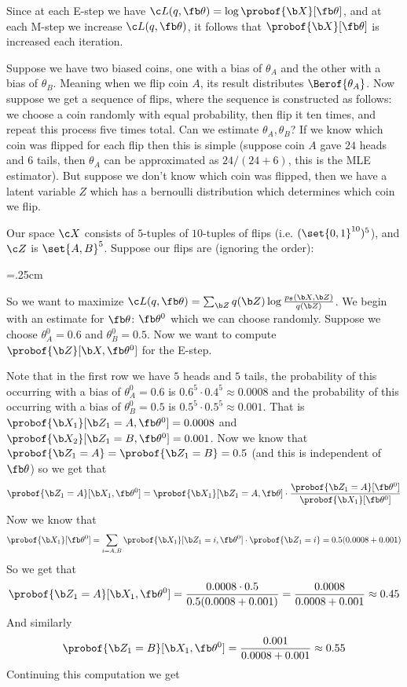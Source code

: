 Since at each E-step we have $\c L(q,\fb\theta)=\log\probof{\b X}[\fb\theta]$, and at each M-step we increase $\c L(q,\fb\theta)$, it follows that $\probof{\b X}[\fb\theta]$ is increased each iteration.

\bexam

    Suppose we have two biased coins, one with a bias of $\theta_A$ and the other with a bias of $\theta_B$.
    Meaning when we flip coin $A$, its result distributes $\Berof{\theta_A}$.
    Now suppose we get a sequence of flips, where the sequence is constructed as follows: we choose a coin randomly with equal probability, then flip it ten times, and repeat this process five times total.
    Can we estimate $\theta_A,\theta_B$?
    If we know which coin was flipped for each flip then this is simple (suppose coin $A$ gave $24$ heads and $6$ tails, then $\theta_A$ can be approximated as $24/(24+6)$, this is the MLE estimator).
    But suppose we don't know which coin was flipped, then we have a latent variable $Z$ which has a bernoulli distribution which determines which coin we flip.

    Our space $\c X$ consists of $5$-tuples of $10$-tuples of flips (i.e. $(\set{0,1}^{10})^5$), and $\c Z$ is $\set{A,B}^5$.
    Suppose our flips are (ignoring the order):
    
    \vfill\break
    \centerline{\vbox{\tabskip=.25cm}}

    So we want to maximize $\c L(q,\fb\theta)=\sum_{\b Z}q(\b Z)\log\frac{p_\theta(\b X,\b Z)}{q(\b Z)}$.
    We begin with an estimate for $\fb\theta$: $\fb\theta^0$ which we can choose randomly.
    Suppose we choose $\theta_A^0=0.6$ and $\theta_B^0=0.5$.
    Now we want to compute $\probof{\b Z}[\b X,\fb\theta^0]$ for the E-step.

    Note that in the first row we have $5$ heads and $5$ tails, the probability of this occurring with a bias of $\theta^0_A=0.6$ is $0.6^5\cdot0.4^5\approx0.0008$ and the probability of this occurring with
    a bias of $\theta^0_B=0.5$ is $0.5^5\cdot0.5^5\approx0.001$.
    That is $\probof{\b X_1}[\b Z_1=A,\fb\theta^0]=0.0008$ and $\probof{\b X_2}[\b Z_1=B,\fb\theta^0]=0.001$.
    Now we know that $\probof{\b Z_1=A}=\probof{\b Z_1=B}=0.5$ (and this is independent of $\fb\theta$) so we get that
    $$ \probof{\b Z_1=A}[\b X_1,\fb\theta^0] = \probof{\b X_1}[\b Z_1=A,\fb\theta] \cdot \frac{\probof{\b Z_1=A}[\fb\theta^0]}{\probof{\b X_1}[\fb\theta^0]} $$
    Now we know that
    $$ \probof{\b X_1}[\fb\theta^0] = \sum_{i=A,B}\probof{\b X_1}[\b Z_1=i,\fb\theta^0]\cdot\probof{\b Z_1=i} = 0.5(0.0008 + 0.001) $$
    So we get that
    $$ \probof{\b Z_1=A}[\b X_1,\fb\theta^0] = \frac{0.0008\cdot0.5}{0.5(0.0008+0.001)} = \frac{0.0008}{0.0008 + 0.001} \approx 0.45 $$
    And similarly
    $$ \probof{\b Z_1=B}[\b X_1,\fb\theta^0] = \frac{0.001}{0.0008 + 0.001} \approx 0.55 $$
    Continuing this computation we get

